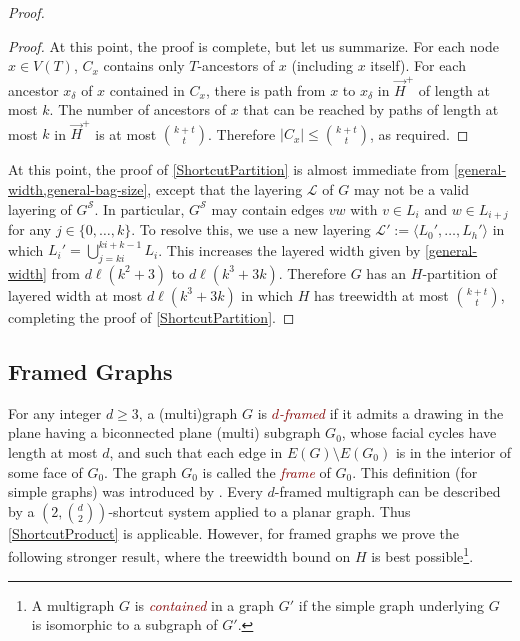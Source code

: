 \documentclass{patmorin}
\theoremstyle{plain}
\theoremstyle{definition}
\newcommand{\defin}[1]{\textcolor{Maroon}{\emph{#1}}}
\newcommand{\note}[2]{\noindent{\color{red}[#1:~#2]}}
\renewcommand{\SS}{\mathcal{S}}
\renewcommand{\ge}{\geqslant}
\renewcommand{\le}{\leqslant}
\begin{document}
\begin{proof}
\begin{proof}


  At this point, the proof is complete, but let us summarize. For each node $x\in V(T)$, $C_x$ contains only $T$-ancestors of $x$ (including $x$ itself).  For each ancestor $x_\delta$ of $x$ contained in $C_x$, there is path from $x$ to $x_\delta$ in $\overrightarrow{H}^+$ of length at most $k$.  The number of ancestors of $x$ that can be reached by paths of length at most $k$ in $\overrightarrow{H}^+$ is at most $\binom{k+t}{t}$.  Therefore $|C_x|\le \binom{k+t}{t}$, as required.
\end{proof}

At this point, the proof of \cref{ShortcutPartition} is almost immediate from \cref{general-width,general-bag-size}, except that the layering $\mathcal{L}$ of $G$ may not be a valid layering of $G^{\SS}$.  In particular, $G^{\SS}$ may contain edges $vw$ with $v\in L_i$ and $w\in L_{i+j}$ for any $j\in\{0,\ldots,k\}$.  To resolve this, we use a new layering $\mathcal{L}':=\langle L_0',\ldots,L_h'\rangle$ in which $L_i'=\bigcup_{j=ki}^{ki+k-1} L_i$.  This increases the layered width given by \cref{general-width} from $d\ell(k^2+3)$ to $d\ell(k^3+3k)$.  Therefore $G$ has an $H$-partition of layered width at most $d\ell(k^3+3k)$ in which $H$ has treewidth at most $\binom{k+t}{t}$, completing the proof of \cref{ShortcutPartition}.
\end{proof}

\subsection{Framed Graphs}

For any integer $d\ge 3$, a (multi)graph $G$ is \defin{$d$-framed} if it admits a drawing in the plane having a biconnected plane (multi) subgraph $G_0$, whose facial cycles have length at most $d$,  and such that each edge in $E(G)\setminus E(G_0)$ is in the interior of some face of $G_0$.
The graph $G_0$ is called the \defin{frame} of $G_0$. This definition (for simple graphs) was introduced by \citet{BDGGMR}. Every $d$-framed multigraph can be described by a $(2,\binom{d}{2})$-shortcut system applied to a planar graph. Thus \cref{ShortcutProduct} is applicable. However, for framed graphs we prove the following stronger result, where the treewidth bound on $H$ is best possible\footnote{A multigraph $G$ is \defin{contained} in a graph $G'$ if the simple graph underlying $G$ is isomorphic to a subgraph of $G'$.}.
\end{document}
